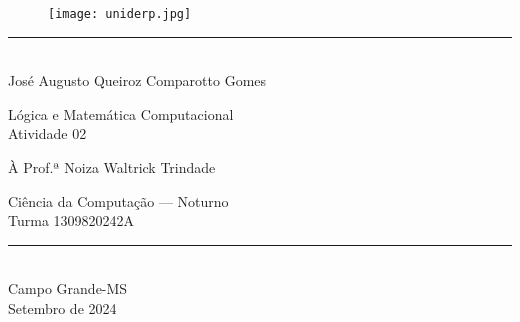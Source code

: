 \documentclass[12pt, a4paper, onecolumn]{exam}
\author{\authorfullname}
\title{\subject: \assignment}
\newcommand{\subject}{Lógica e Matemática Computacional}
\newcommand{\assignment}{Atividade 02}
\newcommand{\authorfullname}{José Augusto Queiroz Comparotto Gomes}
\newcommand{\professor}{Prof.ª Noiza Waltrick Trindade}
\newcommand{\course}{Ciência da Computação — Noturno}
\newcommand{\classno}{1309820242A}
\newcommand{\location}{Campo Grande-MS}
\newcommand{\documentdate}{Setembro de 2024}
\begin{document}
\begingroup  

    \centering
    \begin{figure}
        \centering
        \texttt{[image: uniderp.jpg]}
        \label{fig:university-logo}
    \end{figure}
    
    \rule{\textwidth}{2pt}  \\[1em]
    
    \LARGE \authorfullname

    \vfill
    
    \LARGE \subject     \\
    \LARGE \assignment
    
    \vfill
    
    \large À \professor \\

    \vfill
    
    \large \course          \\
    \large Turma \classno   \\[1em]
    
    \rule{\textwidth}{2pt}  \\[1em]

    \large \location        \\
    \large \documentdate    \\

    \pagebreak
\endgroup

\pointsdroppedatright   %
\printanswers
\renewcommand{\solutiontitle}{\noindent\textbf{Resposta:}\enspace}  
\end{document}

